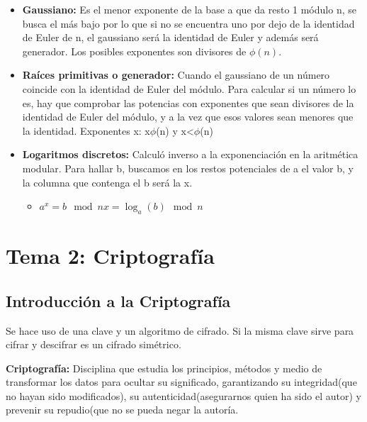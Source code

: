 \documentclass[12pt, twoside, openright]{report} %
\begin{document}
\begin{itemize}
  \item \textbf{Gaussiano:} Es el menor exponente de la base a que da resto
    1 módulo n, se busca el más bajo por lo que si no se encuentra uno
    por dejo de la identidad de Euler de n, el gaussiano será la
    identidad de Euler y además será generador. Los posibles exponentes
    son divisores de $\phi(n)$.
    
  \item \textbf{Raíces primitivas o generador:} Cuando el gaussiano de un
    número coincide con la identidad de Euler del módulo. Para calcular
    si un número lo es, hay que comprobar las potencias con exponentes
    que sean divisores de la identidad de Euler del módulo, y a la vez
    que esos valores sean menores que la identidad. Exponentes x:
    x\textbar $\phi$(n) y x\textless $\phi$(n)
    
  \item \textbf{Logaritmos discretos:} Calculó inverso a la exponenciación
    en la aritmética modular. Para hallar b, buscamos en los restos
    potenciales de a el valor b, y la columna que contenga el b será la
    x.
    

    \begin{itemize}
    \item $a^x = b \mod n x=\log_a(b) \mod n$
      
    \end{itemize}
  \end{itemize}

  
\chapter{Tema 2: Criptografía}
\section{Introducción a la Criptografía}

  Se hace uso de una clave y un algoritmo de cifrado. Si la misma clave
  sirve para cifrar y descifrar es un cifrado simétrico.
  
  \textbf{Criptografía:} Disciplina que estudia los principios, métodos
  y medio de transformar los datos para ocultar su significado,
  garantizando su integridad(que no hayan sido modificados), su
  autenticidad(asegurarnos quien ha sido el autor) y prevenir su
  repudio(que no se pueda negar la autoría.
  
\end{document}
